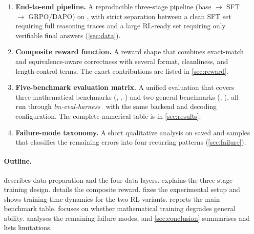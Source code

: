\begin{enumerate}
  \item \textbf{End-to-end pipeline.} A reproducible three-stage pipeline
    (base $\rightarrow$ SFT $\rightarrow$ GRPO/DAPO) on
    , with strict separation between a clean SFT set
    requiring full reasoning traces and a large RL-ready set requiring only
    verifiable final answers (\cref{sec:data}).
  \item \textbf{Composite reward function.} A reward shape that combines
    exact-match and equivalence-aware correctness with several format,
    cleanliness, and length-control terms. The exact contributions are
    listed in \cref{sec:reward}.
  \item \textbf{Five-benchmark evaluation matrix.} A unified evaluation
    that covers three mathematical benchmarks (,
    , ) and two general benchmarks
    (, ), all run through
    \emph{lm-eval-harness}~\cite{lmevalharness} with the same backend and
    decoding configuration. The complete numerical table is in
    \cref{sec:results}.
  \item \textbf{Failure-mode taxonomy.} A short qualitative analysis on
    saved  and  samples that classifies the
    remaining errors into four recurring patterns
    (\cref{sec:failure}).
\end{enumerate}

\paragraph{Outline.}
 describes data preparation and the four data layers.
 explains the three-stage training design.
 details the composite reward.
 fixes the experimental setup and shows training-time
dynamics for the two RL variants.  reports the main
benchmark table.  focuses on whether mathematical
training degrades general ability.  analyses the
remaining failure modes, and \cref{sec:conclusion} summarises and lists
limitations.
